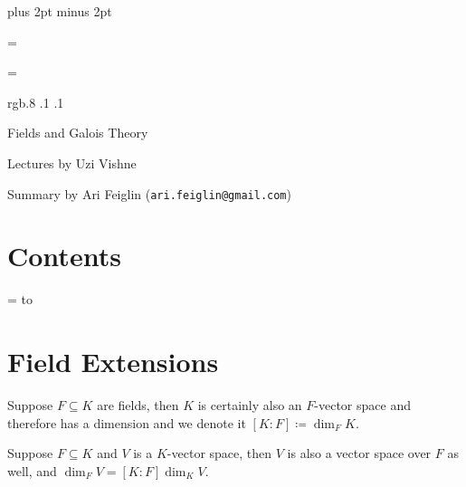 

\parindent=0pt
\parskip=3pt plus 2pt minus 2pt



\footline={}


\headline={}

\color rgb{.8 .1 .1}

{\def\boxshadowcolor{rgb{.6 .4 .6}}

    \centerline{Fields and Galois Theory}
    \smallskip
    \centerline{Lectures by Uzi Vishne}
    \centerline{Summary by Ari Feiglin ({\tt ari.feiglin@gmail.com})}

\eppbox

\bigskip

    \section*{Contents}
    
    \tableofcontents
\eppbox

}

\vfill\break

\color{black}

\newif\ifpageodd
\pageoddtrue
\headline={%
    \hbox to \hsize{\color{black}%
        \ifpageodd\hfil{\it\currsubsection\quad\bf\folio}\global\pageoddfalse%
        \else{\bf\folio\quad\it\currsubsection}\hfil\global\pageoddtrue\fi%
    }%
}

\section{Field Extensions}

Suppose $F\subseteq K$ are fields, then $K$ is certainly also an $F$-vector space and therefore has a dimension and we denote it $[K:F]\coloneqq\dim_FK$.

\bthrm

    Suppose $F\subseteq K$ and $V$ is a $K$-vector space, then $V$ is also a vector space over $F$ as well, and $\dim_FV=[K:F]\dim_KV$.

\ethrm

